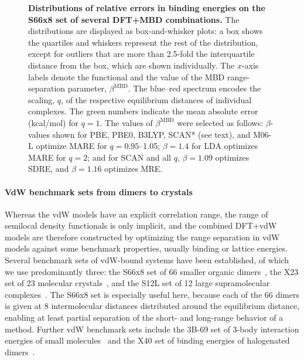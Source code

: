 \begin{figure}[t!]
\caption{\textbf{Distributions of relative errors in binding energies on the S66x8 set of several DFT+MBD combinations.}
The distributions are displayed as box-and-whisker plots: a box shows the quartiles and whiskers represent the rest of the distribution, except for outliers that are more than 2.5-fold the interquartile distance from the box, which are shown individually.
The $x$-axis labels denote the functional and the value of the MBD range-separation parameter, $\beta^\text{MBD}$.
The blue--red spectrum encodes the scaling, $q$, of the respective equilibrium distances of individual complexes.
The green numbers indicate the mean absolute error (kcal/mol) for $q=1$.
The values of $\beta^\text{MBD}$ were selected as follows: $\beta$-values shown for PBE, PBE0, B3LYP, SCAN* (see text), and M06-L optimize MARE for $q=0.95$--1.05; $\beta=1.4$ for LDA optimizes MARE for $q=2$; and for SCAN and all $q$, $\beta=1.09$ optimizes SDRE, and $\beta=1.16$ optimizes MRE\@.
}\label{fig:s66-dists}
\end{figure}

\paragraph{VdW benchmark sets from dimers to crystals}

Whereas the vdW models have an explicit correlation range, the range of semilocal density functionals is only implicit, and the combined DFT+vdW models are therefore constructed by optimizing the range separation in vdW models against some benchmark properties, usually binding or lattice energies.
Several benchmark sets of vdW-bound systems have been established, of which we use predominantly three: the S66x8 set of 66 smaller organic dimers~\cite{RezacJCTC11}, the X23 set of 23 molecular crystals~\cite{Otero-de-la-RozaJCP12,ReillyJCP13}, and the S12L set of 12 large supramolecular complexes~\cite{GrimmeCEJ12}.
The S66x8 set is especially useful here, because each of the 66 dimers is given at 8 intermolecular distances distributed around the equilibrium distance, enabling at least partial separation of the short- and long-range behavior of a method.
Further vdW benchmark sets include the 3B-69 set of 3-body interaction energies of small molecules~\cite{RezacJCTC15} and the X40 set of binding energies of halogenated dimers~\cite{RezacJCTC12}.

